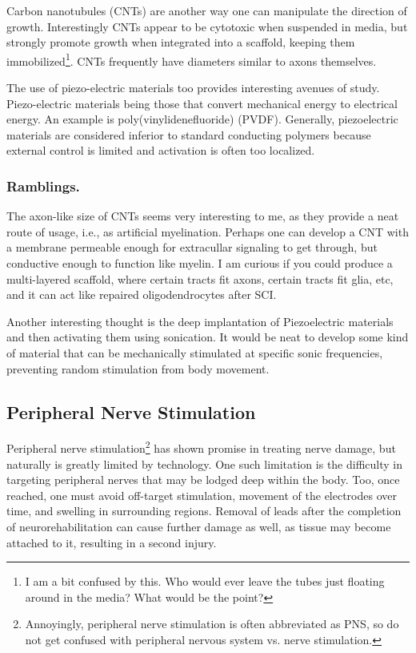 \documentclass[12pt]{report}
\begin{document}
Carbon nanotubules (CNTs) are another way one can manipulate the direction of growth. Interestingly CNTs appear to be cytotoxic when suspended in media, but strongly promote growth when integrated into a scaffold, keeping them immobilized\footnote{I am a bit confused by this. Who would ever leave the tubes just floating around in the media? What would be the point?}. CNTs frequently have diameters similar to axons themselves.\newline

The use of piezo-electric materials too provides interesting avenues of study. Piezo-electric materials being those that convert mechanical energy to electrical energy. An example is poly(vinylidenefluoride) (PVDF). Generally, piezoelectric materials are considered inferior to standard conducting polymers because external control is limited and activation is often too localized. 

\subsubsection{Ramblings.}
The axon-like size of CNTs seems very interesting to me, as they provide a neat route of usage, i.e., as artificial myelination. Perhaps one can develop a CNT with a membrane permeable enough for extracullar signaling to get through, but conductive enough to function like myelin. I am curious if you could produce a multi-layered scaffold, where certain tracts fit axons, certain tracts fit glia, etc, and it can act like repaired oligodendrocytes after SCI.\newline

Another interesting thought is the deep implantation of Piezoelectric materials and then activating them using sonication. It would be neat to develop some kind of material that can be mechanically stimulated at specific sonic frequencies, preventing random stimulation from body movement. 


\subsection{Peripheral Nerve Stimulation} 
Peripheral nerve stimulation\footnote{Annoyingly, peripheral nerve stimulation is often abbreviated as PNS, so do not get confused with peripheral nervous system vs. nerve stimulation.} has shown promise in treating nerve damage, but naturally is greatly limited by technology. One such limitation is the difficulty in targeting peripheral nerves that may be lodged deep within the body. Too, once reached, one must avoid off-target stimulation, movement of the electrodes over time, and swelling in surrounding regions. Removal of leads after the completion of neurorehabilitation can cause further damage as well, as tissue may become attached to it, resulting in a second injury. 
\end{document}
